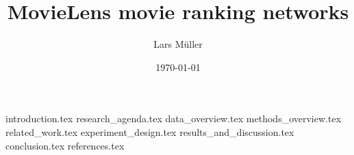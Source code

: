 \documentclass[11pt, a4paper]{article}
\title{MovieLens movie ranking networks}
\author{Lars Müller}
\date{\today}
\begin{document}
\maketitle

\tableofcontents
\newpage

{introduction.tex}
{research_agenda.tex}
{data_overview.tex}
{methods_overview.tex}
{related_work.tex}
{experiment_design.tex}
{results_and_discussion.tex}
{conclusion.tex}
{references.tex}


\newpage
\printbibliography[title={Literaturverzeichnis}]
\end{document}
